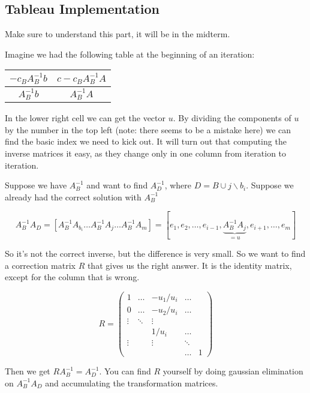 \subsection*{Tableau Implementation}

Make sure to understand this part, it will be in the midterm.

Imagine we had the following table at the beginning of an iteration:

\begin{center}
\begin{tabular}{c|c}
$-c_BA_B^{-1}b$ & $c-c_BA_B^{-1}A$\\\hline
$A^{-1}_B b$ & $A_B^{-1}A$
\end{tabular}
\end{center}

In the lower right cell we can get the vector $u$. By dividing the components of $u$ by the number in the top left (note: there seems to be a mistake here) we can find the basic index we need to kick out. It will turn out that computing the inverse matrices it easy, as they change only in one column from iteration to iteration.

Suppose we have $A_B^{-1}$ and want to find $A_D^{-1}$, where $D=B\cup j \backslash b_i$. Suppose we already had the correct solution with $A_B^{-1}$ 

\[A_B^{-1}A_D = \left[ A_B^{-1}A_{b_i}\ldots A_B^{-1}A_j\ldots A_B^{-1}A_m\right] = \left[ e_1,e_2, \ldots, e_{i-1}, \underbrace{A_B^{-1}A_j}_{=u}, e_{i+1},\ldots, e_m\right]\]

So it's not the correct inverse, but the difference is very small. So we want to find a correction matrix $R$ that gives us the right answer. It is the identity matrix, except for the column that is wrong.

\[R= \begin{pmatrix} %
1 & \ldots & -u_1/u_i & \ldots \\
0 & \ldots & -u_2/u_i & \ldots \\
\vdots & \ddots & \vdots \\
& & 1/u_i & \ldots\\
\vdots & &\vdots &\ddots\\
& & & \ldots & 1
\end{pmatrix}\]

Then we get $RA_B^{-1} = A_D^{-1}$. You can find $R$ yourself by doing gaussian elimination on $A_B^{-1}A_D$ and accumulating the transformation matrices.

